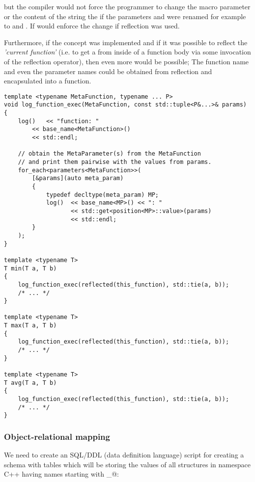 but the compiler would not force the programmer to change the macro parameter
or the content of the string the if the parameters \verb@a@ and \verb@b@ were renamed
for example to \verb@first@ and \verb@second@. If would enforce the change if
reflection was used.

Furthermore, if the  concept was implemented
and if it was possible to reflect the {\em 'current function'} (i.e. to get a 
from inside of a function body via some invocation of the reflection operator),
then even more would be possible; The function name and even the parameter names could
be obtained from reflection and encapsulated into a function.

\begin{verbatim}
template <typename MetaFunction, typename ... P>
void log_function_exec(MetaFunction, const std::tuple<P&...>& params)
{
	log()   << "function: "
		<< base_name<MetaFunction>()
		<< std::endl;

	// obtain the MetaParameter(s) from the MetaFunction
	// and print them pairwise with the values from params.
	for_each<parameters<MetaFunction>>(
		[&params](auto meta_param)
		{
			typedef decltype(meta_param) MP;
			log()  << base_name<MP>() << ": "
			       << std::get<position<MP>::value>(params)
			       << std::endl;
		}
	);
}

template <typename T>
T min(T a, T b)
{
	log_function_exec(reflected(this_function), std::tie(a, b));
	/* ... */
}

template <typename T>
T max(T a, T b)
{
	log_function_exec(reflected(this_function), std::tie(a, b));
	/* ... */
}

template <typename T>
T avg(T a, T b)
{
	log_function_exec(reflected(this_function), std::tie(a, b));
	/* ... */
}
\end{verbatim}

\subsubsection{Object-relational mapping}

We need to create an SQL/DDL (data definition language) script for creating a schema
with tables which will be storing the values of all structures in namespace C++ \verb@foo@
having names starting with \verb@persistent_@:

